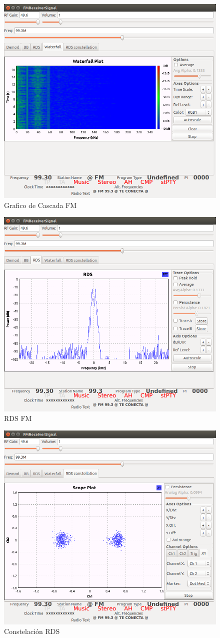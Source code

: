 \documentclass[preprint,12pt]{elsarticle}
\begin{document}
  \begin{figure}[htbp!]
\centering\includegraphics[width=0.6\linewidth]{waterfallfm.png}
\caption{Grafico de Cascada FM}
\label{waterfallFM}
\end{figure}

  \begin{figure}[htbp!]
\centering\includegraphics[width=0.6\linewidth]{rdsfm.png}
\caption{RDS FM}
\label{rdsFM}
\end{figure}


  \begin{figure}[htbp!]
\centering\includegraphics[width=0.6\linewidth]{constelacion.png}
\caption{Constelación RDS}
\label{constell}
\end{figure}
\end{document}
